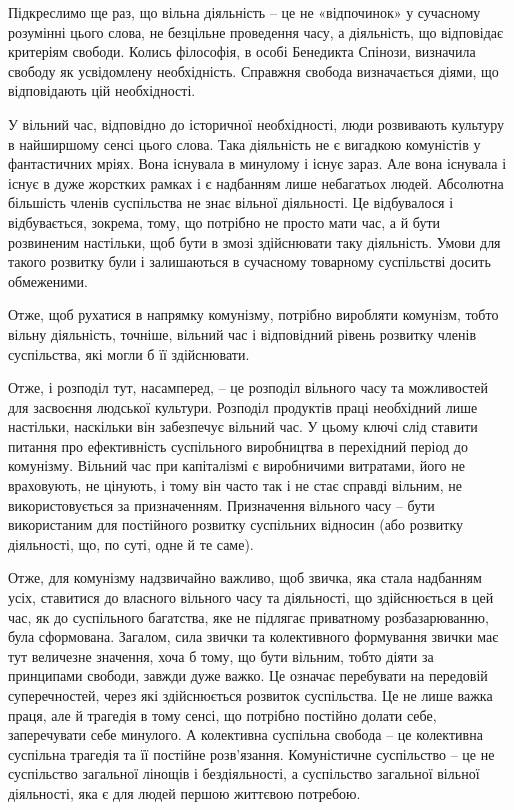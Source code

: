 \documentclass[../main]{subfiles}
\begin{document}
Підкреслимо ще раз, що вільна діяльність – це не «відпочинок» у сучасному розумінні цього слова, не безцільне проведення часу, а діяльність, що відповідає критеріям свободи. Колись філософія, в особі Бенедикта Спінози, визначила свободу як усвідомлену необхідність. Справжня свобода визначається діями, що відповідають цій необхідності.

У вільний час, відповідно до історичної необхідності, люди розвивають культуру в найширшому сенсі цього слова. Така діяльність не є вигадкою комуністів у фантастичних мріях. Вона існувала в минулому і існує зараз. Але вона існувала і існує в дуже жорстких рамках і є надбанням лише небагатьох людей. Абсолютна більшість членів суспільства не знає вільної діяльності. Це відбувалося і відбувається, зокрема, тому, що потрібно не просто мати час, а й бути розвиненим настільки, щоб бути в змозі здійснювати таку діяльність. Умови для такого розвитку були і залишаються в сучасному товарному суспільстві досить обмеженими.

Отже, щоб рухатися в напрямку комунізму, потрібно виробляти комунізм, тобто вільну діяльність, точніше, вільний час і відповідний рівень розвитку членів суспільства, які могли б її здійснювати.

Отже, і розподіл тут, насамперед, – це розподіл вільного часу та можливостей для засвоєння людської культури. Розподіл продуктів праці необхідний лише настільки, наскільки він забезпечує вільний час. У цьому ключі слід ставити питання про ефективність суспільного виробництва в перехідний період до комунізму. Вільний час при капіталізмі є виробничими витратами, його не враховують, не цінують, і тому він часто так і не стає справді вільним, не використовується за призначенням. Призначення вільного часу – бути використаним для постійного розвитку суспільних відносин (або розвитку діяльності, що, по суті, одне й те саме).

Отже, для комунізму надзвичайно важливо, щоб звичка, яка стала надбанням усіх, ставитися до власного вільного часу та діяльності, що здійснюється в цей час, як до суспільного багатства, яке не підлягає приватному розбазарюванню, була сформована. Загалом, сила звички та колективного формування звички має тут величезне значення, хоча б тому, що бути вільним, тобто діяти за принципами свободи, завжди дуже важко. Це означає перебувати на передовій суперечностей, через які здійснюється розвиток суспільства. Це не лише важка праця, але й трагедія в тому сенсі, що потрібно постійно долати себе, заперечувати себе минулого. А колективна суспільна свобода – це колективна суспільна трагедія та її постійне розв’язання. Комуністичне суспільство – це не суспільство загальної лінощів і бездіяльності, а суспільство загальної вільної діяльності, яка є для людей першою життєвою потребою.
\end{document}
